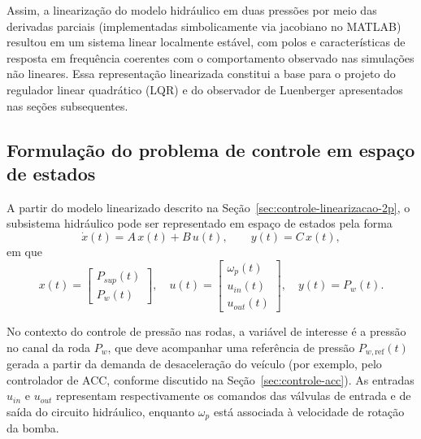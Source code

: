 Assim, a linearização do modelo hidráulico em duas pressões por meio das derivadas parciais (implementadas simbolicamente via jacobiano no MATLAB) resultou em um sistema linear localmente estável, com polos e características de resposta em frequência coerentes com o comportamento observado nas simulações não lineares. Essa representação linearizada constitui a base para o projeto do regulador linear quadrático (LQR) e do observador de Luenberger apresentados nas seções subsequentes.


\subsection{Formulação do problema de controle em espaço de estados}
\label{sec:controle-formulacao-espaço-estados}

A partir do modelo linearizado descrito na Seção~\ref{sec:controle-linearizacao-2p}, o subsistema hidráulico pode ser representado em espaço de estados pela forma
\[
    \dot{x}(t) = A\,x(t) + B\,u(t), \qquad
    y(t) = C\,x(t),
\]
em que
\[
    x(t) = 
    \begin{bmatrix}
        P_{sup}(t) \\
        P_{w}(t)
    \end{bmatrix},
    \quad
    u(t) =
    \begin{bmatrix}
        \omega_p(t) \\
        u_{in}(t) \\
        u_{out}(t)
    \end{bmatrix},
    \quad
    y(t) = P_w(t).
\]

No contexto do controle de pressão nas rodas, a variável de interesse é a pressão no canal da roda $P_w$, que deve acompanhar uma referência de pressão $P_{w,\text{ref}}(t)$ gerada a partir da demanda de desaceleração do veículo (por exemplo, pelo controlador de ACC, conforme discutido na Seção~\ref{sec:controle-acc}). As entradas $u_{in}$ e $u_{out}$ representam respectivamente os comandos das válvulas de entrada e de saída do circuito hidráulico, enquanto $\omega_p$ está associada à velocidade de rotação da bomba.

